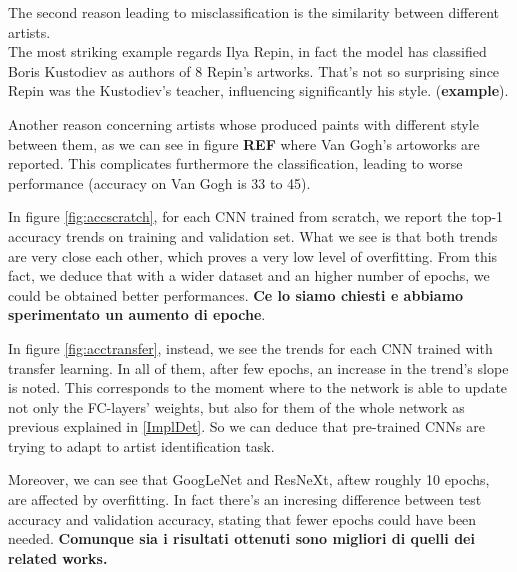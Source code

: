 \documentclass{article}
\begin{document}
The second reason leading to misclassification is the similarity  between different artists.\\
The most striking example regards Ilya Repin, in fact the model has classified Boris Kustodiev as authors of 8 Repin's artworks. That's not so surprising since Repin was the Kustodiev's teacher, influencing significantly his style. (\textbf{example}).

Another reason concerning artists whose produced paints with different style between them, as we can see in figure \textbf{REF} where Van Gogh's artoworks are reported. This complicates furthermore the classification, leading to worse performance (accuracy on Van Gogh is 33 to 45).

In figure \ref{fig:accscratch}, for each CNN trained from scratch,  we report the top-1 accuracy trends on training and validation set. What we see is that both trends are very close each other, which proves a very low level of overfitting.
From this fact, we deduce that with a wider dataset and an higher number of epochs, we could be obtained better performances. \textbf{Ce lo siamo chiesti e abbiamo sperimentato un aumento di epoche}.

In figure \ref{fig:acctransfer}, instead, we see the trends for each CNN trained with transfer learning. In all of them, after few epochs, an increase in the trend's slope is noted. This corresponds to the moment where to the network is able to update not only the FC-layers' weights, but also for them of the whole network as previous explained in \ref{ImplDet}. So we can deduce that pre-trained CNNs are trying to adapt to artist identification task.

Moreover, we can see that GoogLeNet and ResNeXt, aftew roughly 10 epochs, are affected by overfitting. In fact there's an incresing difference between test accuracy and validation accuracy, stating that fewer epochs could have been needed. \textbf{Comunque sia i risultati ottenuti sono migliori di quelli dei related works.}


\end{document}
